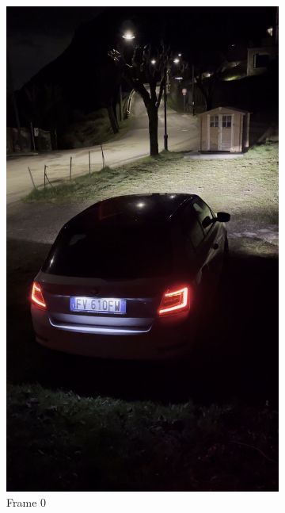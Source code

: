 \begin{figure}[h!]
    \centering
    \begin{subfigure}[b]{0.24\textwidth}
        \includegraphics[width=\textwidth]{Images/featureExtractions/frame00.jpg}
        \caption{Frame 0}
    \end{subfigure}
    \begin{subfigure}[b]{0.24\textwidth}

\end{subfigure}
\end{figure}
